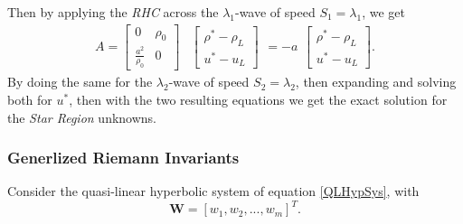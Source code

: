 \documentclass[]{article}
\begin{document}
			Then by applying the \textit{RHC} across the $ \lambda_1 $-wave of speed $ S_1 = \lambda_1 $, we get
			\begin{equation}						
				\begin{aligned}
				A =\left[
					\begin{array}{ll}
						 0 & \rho_0\\
						\frac{a^2}{\rho_0} & 0 
					\end{array}
				\right]
				\end{aligned}
				\begin{aligned}
				\left[
					\begin{array}{ll}
						\rho^*-\rho_L \\
						u^* - u_L
					\end{array}
				\right]
				\end{aligned} =
				-a			
				\begin{aligned}
				\left[
					\begin{array}{ll}
						\rho^*-\rho_L \\
						u^* - u_L
					\end{array}
				\right].
				\end{aligned}
			\end{equation}
			By doing the same for the $ \lambda_2 $-wave of speed $ S_2 = \lambda_2 $, then expanding and solving both for $ u^* $, then with the two resulting equations we get the exact solution for the \textit{Star Region} unknowns.
		\subsubsection{Generlized Riemann Invariants}
			Consider the quasi-linear hyperbolic system of equation \ref{QLHypSys}, with
			\begin{equation}
				\textbf{W} = [w_1, w_2,..., w_m]^T.
			\end{equation}
\end{document}

